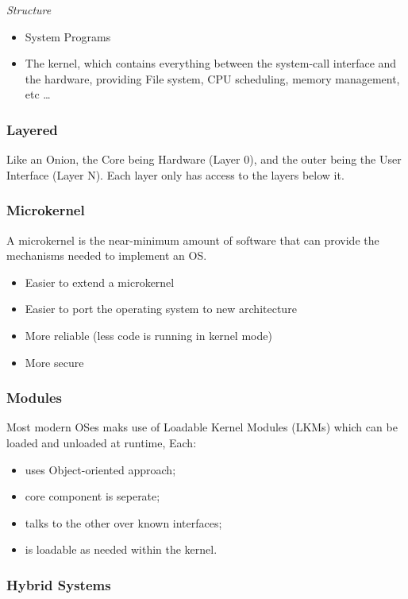 \documentclass[]{article}
\begin{document}
\emph{Structure}
\begin{itemize}
    \item System Programs
    \item The kernel, which contains everything between the system-call interface and the hardware, providing File system, CPU scheduling, memory management, etc \dots
\end{itemize}

\subsubsection*{Layered}

Like an Onion, the Core being Hardware (Layer 0), and the outer being the User Interface (Layer N). Each layer only has access to the layers below it.

\subsubsection*{Microkernel}

A microkernel is the near-minimum amount of software that can provide the mechanisms needed to implement an OS.

\begin{itemize}
    \item Easier to extend a microkernel
    \item Easier to port the operating system to new architecture
    \item More reliable (less code is running in kernel mode)
    \item More secure
\end{itemize}

\subsubsection*{Modules}

Most modern OSes maks use of Loadable Kernel Modules (LKMs) which can be loaded and unloaded at runtime, Each:
\begin{itemize}
    \item uses Object-oriented approach;
    \item core component is seperate;
    \item talks to the other over known interfaces;
    \item is loadable as needed within the kernel.
\end{itemize}

\subsubsection*{Hybrid Systems}
\end{document}
